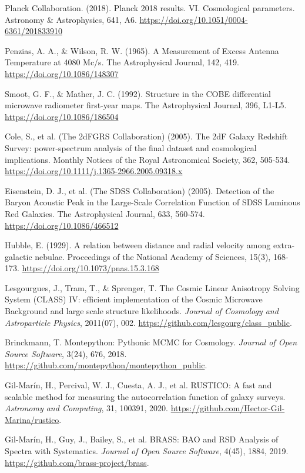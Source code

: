 
\begin{thebibliography}{999}


	 Planck Collaboration. (2018). Planck 2018 results. VI\@. Cosmological parameters. Astronomy \& Astrophysics, 641, A6. \url{https://doi.org/10.1051/0004-6361/201833910}

	 Penzias, A. A., \& Wilson, R. W. (1965). A Measurement of Excess Antenna Temperature at 4080 Mc/s. The Astrophysical Journal, 142, 419. \url{https://doi.org/10.1086/148307}

 Smoot, G. F., \& Mather, J. C. (1992). Structure in the COBE differential microwave radiometer first-year maps. The Astrophysical Journal, 396, L1-L5. \url{https://doi.org/10.1086/186504}

 Cole, S., et al. (The 2dFGRS Collaboration) (2005). The 2dF Galaxy Redshift Survey: power-spectrum analysis of the final dataset and cosmological implications. Monthly Notices of the Royal Astronomical Society, 362, 505-534. \url{https://doi.org/10.1111/j.1365-2966.2005.09318.x}

 Eisenstein, D. J., et al. (The SDSS Collaboration) (2005). Detection of the Baryon Acoustic Peak in the Large-Scale Correlation Function of SDSS Luminous Red Galaxies. The Astrophysical Journal, 633, 560-574. \url{https://doi.org/10.1086/466512}

 Hubble, E. (1929). A relation between distance and radial velocity among extra-galactic nebulae. Proceedings of the National Academy of Sciences, 15(3), 168-173. \url{https://doi.org/10.1073/pnas.15.3.168}

 Lesgourgues, J., Tram, T., \& Sprenger, T. The Cosmic Linear Anisotropy Solving System (CLASS) IV: efficient implementation of the Cosmic Microwave Background and large scale structure likelihoods. \textit{Journal of Cosmology and Astroparticle Physics}, 2011(07), 002. \url{https://github.com/lesgourg/class_public}.

 Brinckmann, T. Montepython: Pythonic MCMC for Cosmology. \textit{Journal of Open Source Software}, 3(24), 676, 2018. \url{https://github.com/montepython/montepython_public}.

 Gil-Marín, H., Percival, W. J., Cuesta, A. J., et al. RUSTICO: A fast and scalable method for measuring the autocorrelation function of galaxy surveys. \textit{Astronomy and Computing}, 31, 100391, 2020. \url{https://github.com/Hector-Gil-Marina/rustico}.

 Gil-Marín, H., Guy, J., Bailey, S., et al. BRASS: BAO and RSD Analysis of Spectra with Systematics. \textit{Journal of Open Source Software}, 4(45), 1884, 2019. \url{https://github.com/brass-project/brass}.

\end{thebibliography}
